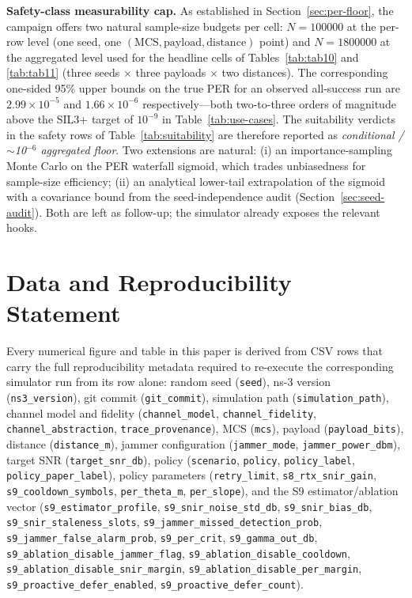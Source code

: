 \documentclass[journal,onecolumn,11pt,a4paper]{IEEEtran}
\begin{document}
\textbf{Safety-class measurability cap.} As established in
Section~\ref{sec:per-floor}, the campaign offers two natural
sample-size budgets per cell: $N=\num{100000}$ at the
per-row level (one seed, one $(\mathrm{MCS},\mathrm{payload},
\mathrm{distance})$ point) and $N=\num{1800000}$ at the
aggregated level used for the headline cells of
Tables~\ref{tab:tab10} and \ref{tab:tab11} (three seeds
$\times$ three payloads $\times$ two distances). The
corresponding one-sided 95\% upper bounds on the true PER for an
observed all-success run are $2.99\times 10^{-5}$ and
$1.66\times 10^{-6}$ respectively---both two-to-three orders of
magnitude above the SIL3+ target of $10^{-9}$ in
Table~\ref{tab:use-cases}. The suitability verdicts in the safety
rows of Table~\ref{tab:suitability} are therefore reported as
\emph{conditional / $\sim$10$^{-6}$ aggregated floor}. Two
extensions are natural: (i) an importance-sampling Monte Carlo on
the PER waterfall sigmoid, which trades unbiasedness for
sample-size efficiency; (ii) an analytical lower-tail
extrapolation of the sigmoid \cite{TGax571,Iyy22} with a
covariance bound from the seed-independence audit
(Section~\ref{sec:seed-audit}). Both are left as follow-up; the
simulator already exposes the relevant hooks.

\section{Data and Reproducibility Statement}
\label{sec:reproducibility}

Every numerical figure and table in this paper is derived from CSV
rows that carry the full reproducibility metadata required to
re-execute the corresponding simulator run from its row alone:
random seed (\texttt{seed}), ns-3 version (\texttt{ns3\_version}), git
commit (\texttt{git\_commit}), simulation path
(\texttt{simulation\_path}), channel model and fidelity
(\texttt{channel\_model}, \texttt{channel\_fidelity},
\texttt{channel\_abstraction}, \texttt{trace\_provenance}), MCS
(\texttt{mcs}), payload (\texttt{payload\_bits}), distance
(\texttt{distance\_m}), jammer configuration (\texttt{jammer\_mode},
\texttt{jammer\_power\_dbm}), target SNR (\texttt{target\_snr\_db}),
policy (\texttt{scenario}, \texttt{policy}, \texttt{policy\_label},
\texttt{policy\_paper\_label}), policy parameters
(\texttt{retry\_limit}, \texttt{s8\_rtx\_snir\_gain},
\texttt{s9\_cooldown\_symbols}, \texttt{per\_theta\_m},
\texttt{per\_slope}), and the S9 estimator/ablation vector
(\texttt{s9\_estimator\_profile}, \texttt{s9\_snir\_noise\_std\_db},
\texttt{s9\_snir\_bias\_db}, \texttt{s9\_snir\_staleness\_slots},
\texttt{s9\_jammer\_missed\_detection\_prob},
\texttt{s9\_jammer\_false\_alarm\_prob}, \texttt{s9\_per\_crit},
\texttt{s9\_gamma\_out\_db},
\texttt{s9\_ablation\_disable\_jammer\_flag},
\texttt{s9\_ablation\_disable\_cooldown},
\texttt{s9\_ablation\_disable\_snir\_margin},
\texttt{s9\_ablation\_disable\_per\_margin},
\texttt{s9\_proactive\_defer\_enabled},
\texttt{s9\_proactive\_defer\_count}).
\end{document}
